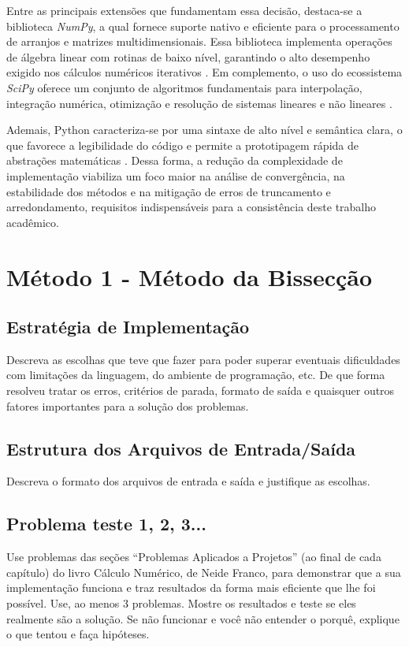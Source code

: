 \documentclass[a4paper,12pt]{article}
\begin{document}
Entre as principais extensões que fundamentam essa decisão, destaca-se a biblioteca \textit{NumPy}, a qual fornece suporte nativo e eficiente para o processamento de arranjos e matrizes multidimensionais. Essa biblioteca implementa operações de álgebra linear com rotinas de baixo nível, garantindo o alto desempenho exigido nos cálculos numéricos iterativos \cite{harris2020array}. Em complemento, o uso do ecossistema \textit{SciPy} oferece um conjunto de algoritmos fundamentais para interpolação, integração numérica, otimização e resolução de sistemas lineares e não lineares \cite{virtanen2020scipy}.

Ademais, Python caracteriza-se por uma sintaxe de alto nível e semântica clara, o que favorece a legibilidade do código e permite a prototipagem rápida de abstrações matemáticas \cite{johansson2018numerical}. Dessa forma, a redução da complexidade de implementação viabiliza um foco maior na análise de convergência, na estabilidade dos métodos e na mitigação de erros de truncamento e arredondamento, requisitos indispensáveis para a consistência deste trabalho acadêmico.

\newpage
\section{Método 1 - Método da Bissecção}

\subsection{Estratégia de Implementação}
Descreva as escolhas que teve que fazer para poder superar eventuais dificuldades com limitações da linguagem, do ambiente de programação, etc.
De que forma resolveu tratar os erros, critérios de parada, formato de saída e quaisquer outros fatores importantes para a solução dos problemas.

\subsection{Estrutura dos Arquivos de Entrada/Saída}
Descreva o formato dos arquivos de entrada e saída e justifique as escolhas.

\subsection{Problema teste 1, 2, 3...}
Use problemas das seções “Problemas Aplicados a Projetos” (ao final de cada capítulo) do livro Cálculo Numérico, de Neide Franco, para demonstrar que a sua implementação funciona e traz resultados da forma mais eficiente que lhe foi possível. Use, ao menos 3 problemas. Mostre os resultados e teste se eles realmente são a solução. Se não funcionar e você não entender o porquê, explique o que tentou e faça hipóteses.
\end{document}
